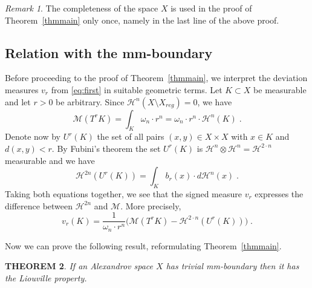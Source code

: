 \documentclass[12pt,leqno]{amsart}
\numberwithin{equation}{section}
\newtheorem{thm}{THEOREM}[section]
\theoremstyle{definition}
\theoremstyle{remark}
\newtheorem{rem}[thm]{Remark}
\newcommand{\tref}[1]{Theorem~\ref{#1}}
\begin{document}
\begin{rem}
The completeness of the space $X$ is used in the proof of \tref{thmmain} only once, namely in the last line of the above proof.
\end{rem}

\subsection{Relation with the mm-boundary}
Before proceeding to the proof of  \tref{thmmain}, we interpret the deviation measures $v_r$ from \eqref{eq:first} in suitable geometric terms.
Let $K\subset X$ be    measurable   and let $r>0$ be arbitrary.
Since $\mathcal H^n (X\setminus X_{reg} )=0$, we have
$$\mathcal M (T^{r} K) =\int _K \omega _n \cdot r^n  =\omega _n \cdot r^n \cdot \mathcal H^n (K) \; .$$
Denote now by $U^r(K)$
the set of all pairs $(x,y)\in X\times X$ with $x\in K$ and $d(x,y)<r$.
By Fubini's theorem the set $U^r(K)$ is $\mathcal H^n \otimes \mathcal H^n =\mathcal H^{2\cdot n}$ measurable and we have
$$\mathcal H^{2n} (U^r (K))= \int _K b_r (x) \cdot  d\mathcal H^n (x) \;. $$
Taking both equations  together, we see that the signed measure $v_r$ expresses the difference between $\mathcal H^{2n}$ and $\mathcal M$. More precisely,
\begin{equation} \label{eq:compare}
v_r (K) = \frac 1 {\omega_n \cdot r^n} \Big(\mathcal M (T^r K)- \mathcal H^{2\cdot n} (U^r (K)) \Big)\;.
\end{equation}



Now we can prove the following result,  reformulating \tref{thmmain}.
\begin{thm} \label{reform}
If an Alexandrov space $X$ has trivial mm-boundary then  it has the Liouville property.
\end{thm}
\end{document}
